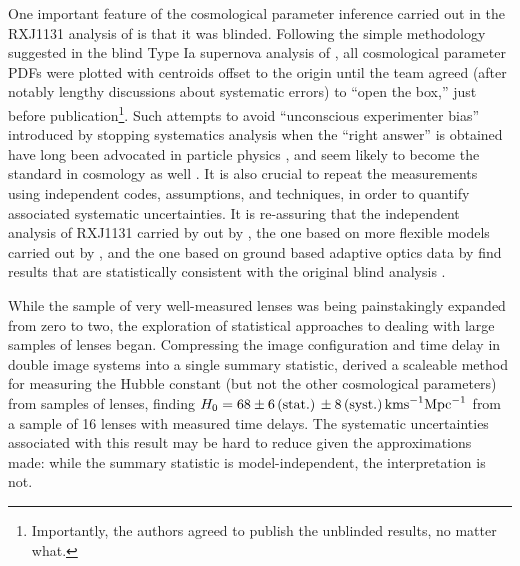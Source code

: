 One important feature of the cosmological parameter inference carried
out in the RXJ1131 analysis of \citet{Suy++13} is that it was blinded.
Following the simple methodology suggested in the blind Type Ia
supernova analysis of \citet{Con++06}, all cosmological parameter PDFs
were plotted with centroids offset to the origin until the team agreed
(after notably lengthy discussions about systematic errors) to ``open
the box,'' just before publication\footnote{Importantly, the authors
agreed to publish the unblinded results, no matter what.}. Such
attempts to avoid ``unconscious experimenter bias'' introduced by
stopping systematics analysis when the ``right answer'' is obtained
have long been advocated in particle physics
\citep{klein2005blind}, and seem likely to become the standard in
cosmology as well \citep[e.g.][]{STEP,DESWL}. It is also crucial to
repeat the measurements using independent codes, assumptions, and
techniques, in order to quantify associated systematic
uncertainties. It is re-assuring that the independent analysis of
RXJ1131 carried by out by \citet{BirrerEtal2015}, the one based on
more flexible models carried out by \citet{Suy++14}, and the one based
on ground based adaptive optics data by \citet{Che++16} find results that are
statistically consistent with the original blind analysis \citep{Suy++13}.

While the sample of very well-measured lenses was being painstakingly
expanded from zero to two, the exploration of statistical approaches
to dealing with large samples of lenses began.  Compressing the image
configuration and time delay in double image systems into a single
summary statistic, \citet{Ogu07b} derived a scaleable method for
measuring the Hubble constant (but not the other cosmological
parameters) from samples of lenses, finding
$H_0=68\pm6\,{\rm(stat.)}\,\pm8\,{\rm (syst.)}\,{\rm km s}^{-1}{\rm
Mpc}^{-1}$ from a sample of 16 lenses with measured time delays. The
systematic uncertainties associated with this result may be hard to
reduce given the approximations made: while the summary statistic is
model-independent, the interpretation is not.

